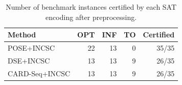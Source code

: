 \begin{table}[!htbp]
\centering
\caption{Number of benchmark instances certified by each SAT encoding after preprocessing.}
\label{tab:pose_encoding_certification}
\small
\begin{tabular}{lrrrr}
\toprule
Method & OPT & INF & TO & Certified \\
\midrule
POSE+INCSC & 22 & 13 & 0 & 35/35 \\
DSE+INCSC & 13 & 13 & 9 & 26/35 \\
CARD-Seq+INCSC & 13 & 13 & 9 & 26/35 \\
\bottomrule
\end{tabular}
\end{table}
